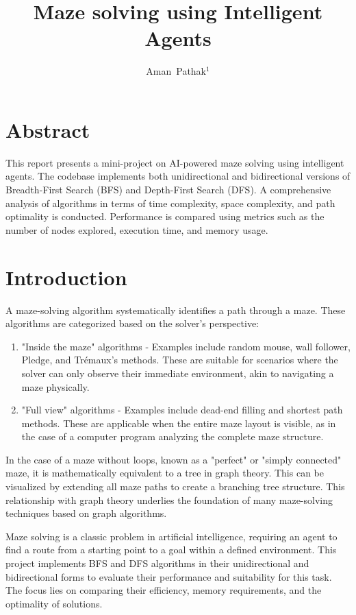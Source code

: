 \documentclass[final, journal, 11pt]{report}
\title{\textbf{Maze solving using Intelligent Agents}}
\author{Aman~Pathak$^{1}$}
\affil{$^1$Kalinga Institute of Industrial Technology, Bhubaneshwar\\{\footnotesize apathakcse@gmail.com}}
\date{}
\begin{document}
	\maketitle
	
	\section*{Abstract}
	This report presents a mini-project on AI-powered maze solving using intelligent agents. The codebase implements both unidirectional and bidirectional versions of Breadth-First Search (BFS) and Depth-First Search (DFS). A comprehensive analysis of algorithms in terms of time complexity, space complexity, and path optimality is conducted. Performance is compared using metrics such as the number of nodes explored, execution time, and memory usage.
	
	\section*{Introduction}
	
	A maze-solving algorithm systematically identifies a path through a maze. These algorithms are categorized based on the solver's perspective:
	
	\begin{enumerate}
	\item "Inside the maze" algorithms - Examples include random mouse, wall follower, Pledge, and Trémaux's methods. These are suitable for scenarios where the solver can only observe their immediate environment, akin to navigating a maze physically.

	\item "Full view" algorithms - Examples include dead-end filling and shortest path methods. These are applicable when the entire maze layout is visible, as in the case of a computer program analyzing the complete maze structure.
	\end{enumerate}

	
	In the case of a maze without loops, known as a "perfect" or "simply connected" maze, it is mathematically equivalent to a tree in graph theory. This can be visualized by extending all maze paths to create a branching tree structure. This relationship with graph theory underlies the foundation of many maze-solving techniques based on graph algorithms.
	
	Maze solving is a classic problem in artificial intelligence, requiring an agent to find a route from a starting point to a goal within a defined environment. This project implements BFS and DFS algorithms in their unidirectional and bidirectional forms to evaluate their performance and suitability for this task. The focus lies on comparing their efficiency, memory requirements, and the optimality of solutions.
	
\end{document}
